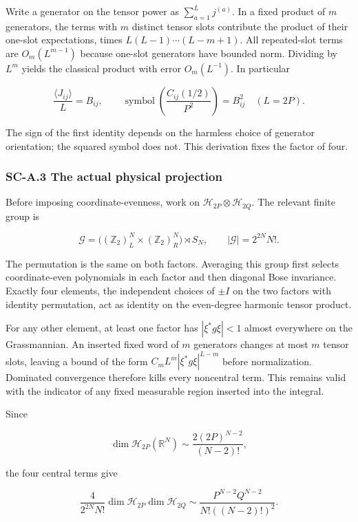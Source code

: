 Write a generator on the tensor power as \(\sum_{a=1}^L j^{(a)}\). In a fixed product of \(m\) generators, the terms with \(m\) distinct tensor slots contribute the product of their one-slot expectations, times \(L(L-1)\cdots(L-m+1)\). All repeated-slot terms are \(O_m(L^{m-1})\) because one-slot generators have bounded norm. Dividing by \(L^m\) yields the classical product with error \(O_m(L^{-1})\). In particular

\[
\frac{\langle J_{ij}\rangle}{L}=B_{ij},\qquad
\operatorname{symbol}\left(\frac{C_{ij}(1/2)}{P^2}\right)=B_{ij}^2
\quad(L=2P).
\]

The sign of the first identity depends on the harmless choice of generator orientation; the squared symbol does not. This derivation fixes the factor of four.

\hypertarget{sc-a.3-the-actual-physical-projection}{%
\subsubsection{SC-A.3 The actual physical projection}\label{sc-a.3-the-actual-physical-projection}}

Before imposing coordinate-evenness, work on \(\mathcal H_{2P}\otimes\mathcal H_{2Q}\). The relevant finite group is

\[
\mathcal G=\big((\mathbb Z_2)^N_L\times(\mathbb Z_2)^N_R\big)\rtimes S_N,
\qquad |\mathcal G|=2^{2N}N!.
\]

The permutation is the same on both factors. Averaging this group first selects coordinate-even polynomials in each factor and then diagonal Bose invariance. Exactly four elements, the independent choices of \(\pm I\) on the two factors with identity permutation, act as identity on the even-degree harmonic tensor product.

For any other element, at least one factor has \(|\xi^*g\xi|<1\) almost everywhere on the Grassmannian. An inserted fixed word of \(m\) generators changes at most \(m\) tensor slots, leaving a bound of the form \(C_m L^m|\xi^*g\xi|^{L-m}\) before normalization. Dominated convergence therefore kills every noncentral term. This remains valid with the indicator of any fixed measurable region inserted into the integral.

Since

\[
\dim\mathcal H_{2P}(\mathbb R^N)
\sim\frac{2(2P)^{N-2}}{(N-2)!},
\]

the four central terms give

\[
\frac4{2^{2N}N!}\dim\mathcal H_{2P}\dim\mathcal H_{2Q}
\sim\frac{P^{N-2}Q^{N-2}}{N!((N-2)!)^2}.
\]

